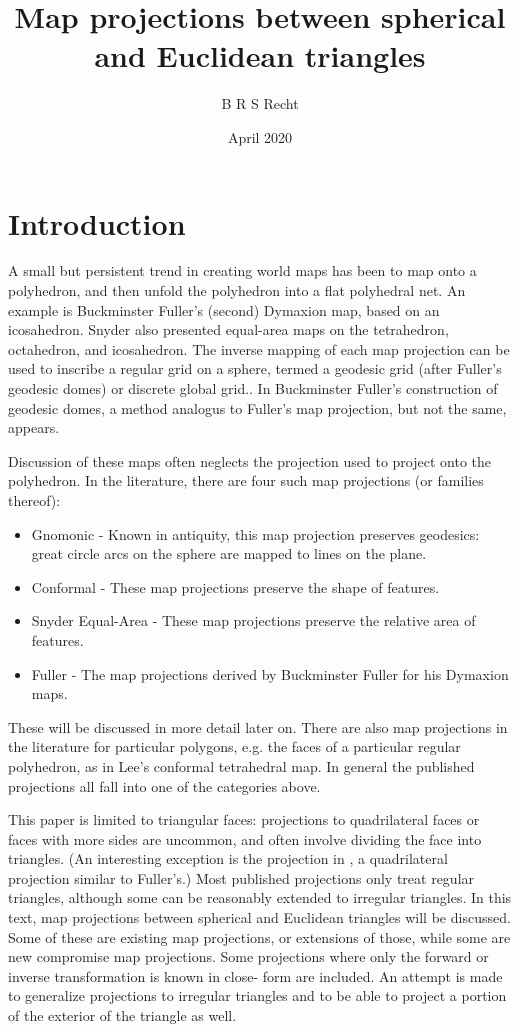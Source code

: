 \documentclass{amsart}[12pt]
\title{Map projections between spherical and Euclidean triangles}
\author{B R S Recht}
\date{April 2020}
\begin{document}
\maketitle
\tableofcontents

\section{Introduction}
A small but persistent trend in creating world maps has been to map onto a
polyhedron, and then unfold the polyhedron into a flat polyhedral net. An
example is Buckminster Fuller's (second) Dymaxion map, based on an
icosahedron.\cite{gray94} Snyder also presented equal-area maps on the
tetrahedron, octahedron, and icosahedron.\cite{snyder92} The inverse mapping of
each map projection can be used to inscribe a regular grid on a sphere, termed
a geodesic grid (after Fuller's geodesic domes) or discrete global
grid.\cite{williamson}\cite{sahr98}. In Buckminster Fuller's construction of
geodesic domes, a method analogus to Fuller's map projection, but not the same,
appears.\cite{kenner}

Discussion of these maps often neglects the projection used to project onto the
polyhedron. In the literature, there are four such map projections
(or families thereof):
\begin{itemize}
\item Gnomonic - Known in antiquity, this map projection preserves geodesics:
  great circle arcs on the sphere are mapped to lines on the plane.
\item Conformal - These map projections preserve the shape of features.
\item Snyder Equal-Area - These map projections preserve the relative area of
  features.\cite{snyder92}
\item Fuller - The map projections derived by Buckminster Fuller
  for his Dymaxion maps.\cite{gray94}\cite{gray95}\cite{crider08}
\end{itemize}
These will be discussed in more detail later on. There are also map projections
in the literature for particular polygons, e.g. the faces of a particular
regular polyhedron, as in Lee's conformal tetrahedral map.\cite{lee} In general
the published projections all fall into one of the categories above.

This paper is limited to triangular faces: projections to quadrilateral faces
or faces with more sides are uncommon, and often involve dividing the face into
triangles. (An interesting exception is the projection in \cite{crider09}, a
quadrilateral projection similar to Fuller's.) Most published projections only
treat regular triangles, although some can be reasonably extended to irregular
triangles. In this text, map projections between spherical and Euclidean
triangles will be discussed. Some of these are existing map projections, or
extensions of those, while some are new compromise map projections. Some
projections where only the forward or inverse transformation is known in close-
form are included. An attempt is made to generalize projections to irregular
triangles and to be able to project a portion of the exterior of the triangle
as well.
\end{document}
